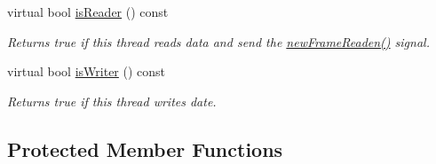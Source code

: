 \begin{DoxyCompactItemize}
virtual bool \hyperlink{classmdt_port_thread_acdb3d96287c571cc08ef39860dc324b1}{isReader} () const 
\begin{DoxyCompactList}\small\item\em Returns true if this thread reads data and send the \hyperlink{classmdt_port_thread_a7fc2245c753fd65e1beffec211c41461}{newFrameReaden()} signal. \end{DoxyCompactList}\item 
virtual bool \hyperlink{classmdt_port_thread_a0122a12262052cf3643241a3eaa31c58}{isWriter} () const 
\begin{DoxyCompactList}\small\item\em Returns true if this thread writes date. \end{DoxyCompactList}\end{DoxyCompactItemize}
\subsection*{Protected Member Functions}
